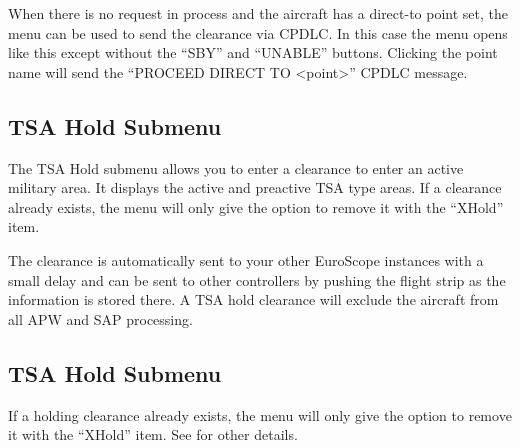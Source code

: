 \documentclass[11pt,a4paper,oldfontcommands]{memoir}
\begin{document}
When there is no request in process and the aircraft has a direct-to point set, the menu
can be used to send the clearance via CPDLC. In this case the menu opens like this except
without the “SBY” and “UNABLE” buttons. Clicking the point name will send the
“PROCEED DIRECT TO <point>” CPDLC message.

\subsection*{TSA Hold Submenu}
The TSA Hold submenu allows you to enter a clearance to enter an active military area. It displays the active
and preactive TSA type areas. If a clearance already exists, the menu will only give the option to remove it
with the “XHold” item.

The clearance is automatically sent to your other EuroScope instances with a small delay and can be sent to
other controllers by pushing the flight strip as the information is stored there. A TSA hold clearance will
exclude the aircraft from all APW and SAP processing.

\subsection*{TSA Hold Submenu}
If a holding clearance already exists, the menu will only give the option to remove it with the “XHold” item.
See \textit{} for other details.
\end{document}
